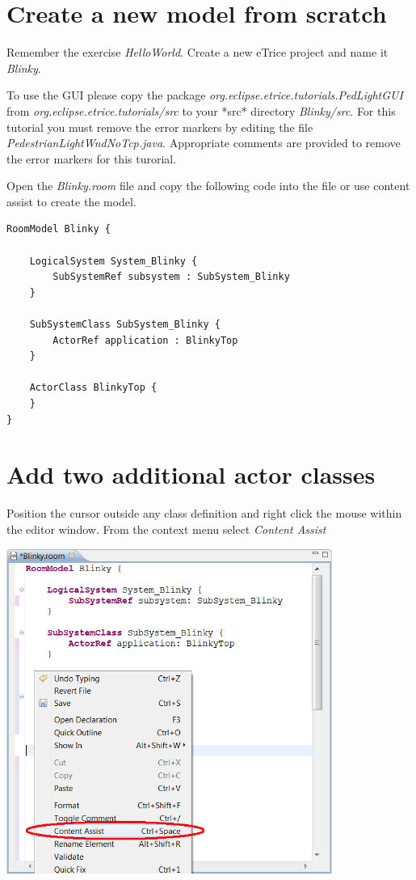 \section{Create a new model from scratch}

Remember the exercise \textit{HelloWorld}.
Create a new eTrice project and name it \textit{Blinky}.

To use the GUI please copy the package \textit{org.eclipse.etrice.tutorials.PedLightGUI} from 
\textit{org.eclipse.etrice.tutorials/src} to your *src* directory \textit{Blinky/src}. For this tutorial 
you must remove the error markers by editing the file \textit{PedestrianLightWndNoTcp.java}. Appropriate 
comments are provided to remove the error markers for this turorial.

Open the \textit{Blinky.room} file and copy the following code into the file or use content assist to 
create the model.

\begin{verbatim} 
RoomModel Blinky {

    LogicalSystem System_Blinky {
        SubSystemRef subsystem : SubSystem_Blinky
    }

    SubSystemClass SubSystem_Blinky {
        ActorRef application : BlinkyTop
    }

    ActorClass BlinkyTop {
    }
}
\end{verbatim}

\section{Add two additional actor classes}

Position the cursor outside any class definition and right click the mouse within the editor window. From 
the context menu select \textit{Content Assist}  

\includegraphics[width=0.8\textwidth]{images/020-Blinky02.png}

